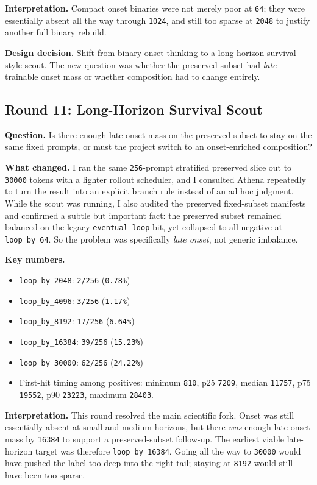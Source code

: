 \documentclass[11pt]{article}
\begin{document}
\textbf{Interpretation.} Compact onset binaries were not merely poor at \texttt{64}; they were essentially absent all the way through \texttt{1024}, and still too sparse at \texttt{2048} to justify another full binary rebuild.

\textbf{Design decision.} Shift from binary-onset thinking to a long-horizon survival-style scout. The new question was whether the preserved subset had \emph{late} trainable onset mass or whether composition had to change entirely.

\subsection*{Round 11: Long-Horizon Survival Scout}
\textbf{Question.} Is there enough late-onset mass on the preserved subset to stay on the same fixed prompts, or must the project switch to an onset-enriched composition?

\textbf{What changed.} I ran the same \texttt{256}-prompt stratified preserved slice out to \texttt{30000} tokens with a lighter rollout scheduler, and I consulted Athena repeatedly to turn the result into an explicit branch rule instead of an ad hoc judgment. While the scout was running, I also audited the preserved fixed-subset manifests and confirmed a subtle but important fact: the preserved subset remained balanced on the legacy \texttt{eventual\_loop} bit, yet collapsed to all-negative at \texttt{loop\_by\_64}. So the problem was specifically \emph{late onset}, not generic imbalance.

\textbf{Key numbers.}
\begin{itemize}
  \item \texttt{loop\_by\_2048}: \texttt{2/256} (\texttt{0.78\%})
  \item \texttt{loop\_by\_4096}: \texttt{3/256} (\texttt{1.17\%})
  \item \texttt{loop\_by\_8192}: \texttt{17/256} (\texttt{6.64\%})
  \item \texttt{loop\_by\_16384}: \texttt{39/256} (\texttt{15.23\%})
  \item \texttt{loop\_by\_30000}: \texttt{62/256} (\texttt{24.22\%})
  \item First-hit timing among positives:
    minimum \texttt{810},
    p25 \texttt{7209},
    median \texttt{11757},
    p75 \texttt{19552},
    p90 \texttt{23223},
    maximum \texttt{28403}.
\end{itemize}

\textbf{Interpretation.} This round resolved the main scientific fork. Onset was still essentially absent at small and medium horizons, but there \emph{was} enough late-onset mass by \texttt{16384} to support a preserved-subset follow-up. The earliest viable late-horizon target was therefore \texttt{loop\_by\_16384}. Going all the way to \texttt{30000} would have pushed the label too deep into the right tail; staying at \texttt{8192} would still have been too sparse.
\end{document}

